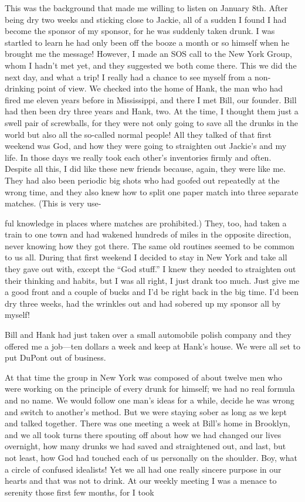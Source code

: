 \begin{biblechapter}
This was the background that made me willing to listen on January 8th. After being dry two weeks and sticking close to Jackie, all of a sudden I found I had become the sponsor of my sponsor, for he was suddenly taken drunk. I was startled to learn he had only been off the booze a month or so himself when he brought me the message! However, I made an SOS call to the New York Group, whom I hadn’t met yet, and they suggested we both come there. This we did the next day, and what a trip! I really had a chance to see myself from a non-drinking point of view. We checked into the home of Hank, the man who had fired me eleven years before in Mississippi, and there I met Bill, our founder. Bill had then been dry three years and Hank, two. At the time, I thought them just a swell pair of screwballs, for they were not only going to save all the drunks in the world but also all the so-called normal people! All they talked of that first weekend was God, and how they were going to straighten out Jackie’s and my life. In those days we really took each other’s inventories firmly and often. Despite all this, I did like these new friends because, again, they were like me. They had also been periodic big shots who had goofed out repeatedly at the wrong time, and they also knew how to split one paper match into three separate matches. (This is very use-

ful knowledge in places where matches are prohibited.) They, too, had taken a train to one town and had wakened hundreds of miles in the opposite direction, never knowing how they got there. The same old routines seemed to be common to us all. During that first weekend I decided to stay in New York and take all they gave out with, except the “God stuff.” I knew they needed to straighten out their thinking and habits, but I was all right, I just drank too much. Just give me a good front and a couple of bucks and I’d be right back in the big time. I’d been dry three weeks, had the wrinkles out and had sobered up my sponsor all by myself!

Bill and Hank had just taken over a small automobile polish company and they offered me a job—ten dollars a week and keep at Hank’s house. We were all set to put DuPont out of business.

At that time the group in New York was composed of about twelve men who were working on the principle of every drunk for himself; we had no real formula and no name. We would follow one man’s ideas for a while, decide he was wrong and switch to another’s method. But we were staying sober as long as we kept and talked together. There was one meeting a week at Bill’s home in Brooklyn, and we all took turns there spouting off about how we had changed our lives overnight, how many drunks we had saved and straightened out, and last, but not least, how God had touched each of us personally on the shoulder. Boy, what a circle of confused idealists! Yet we all had one really sincere purpose in our hearts and that was not to drink. At our weekly meeting I was a menace to serenity those first few months, for I took


\end{biblechapter}
